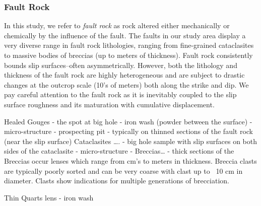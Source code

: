 \documentclass[12pt,a4paper]{article}
\begin{document}
\subsubsection{Fault Rock} 


    

	


In this study, we refer to \textit{fault rock} as rock altered either mechanically or chemically by the influence of the fault. The faults in our study area display a very diverse range in fault rock lithologies, ranging from fine-grained cataclasites to massive  bodies of breccias (up to meters of thickness). Fault rock consistently bounds slip surfaces--often asymmetrically.  However,  both the lithology and thickness of the fault rock are highly heterogeneous and are subject to drastic changes at the outcrop scale (10’s of meters) both along the strike and dip. We pay careful attention to the fault rock as it is inevitably coupled to the slip surface roughness and its maturation with cumulative displacement. 

Healed Gouges
-	the spot at big hole
-	iron wash (powder between the surface)
-	micro-structure
-	prospecting pit
-	typically on thinned sections of the fault rock (near the slip surface)
Cataclasites ….
-	big hole sample with slip surfaces on both sides of the cataclasite
-	micro-structure
-	
Breccias…
-	thick sections  of the 
Breccias occur lenses which range from cm’s to meters in thickness. Breccia clasts are typically poorly sorted and can be very coarse with clast up to ~10 cm in diameter. Clasts show indications for multiple generations of brecciation.


Thin Quarts lens
-	iron wash
\end{document}
